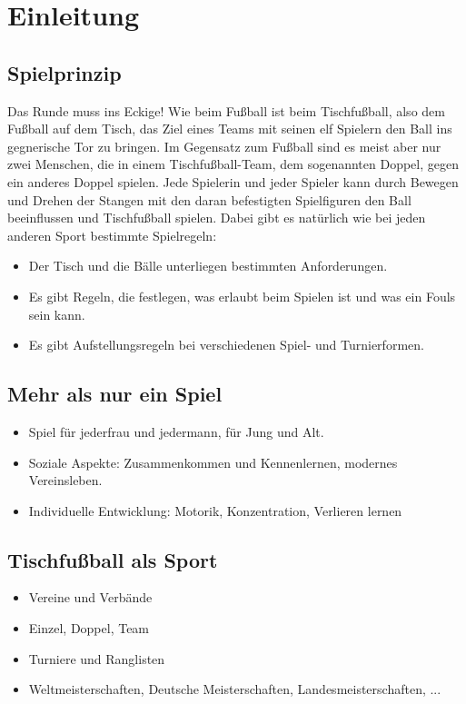 \chapter{Einleitung}

\section{Spielprinzip}

Das Runde muss ins Eckige! Wie beim Fußball ist beim Tischfußball, also dem Fußball auf dem Tisch, das Ziel eines Teams mit seinen elf Spielern den Ball ins gegnerische Tor zu bringen.  
Im Gegensatz zum Fußball sind es meist aber nur zwei Menschen, die in einem Tischfußball-Team, dem sogenannten Doppel, gegen ein anderes Doppel spielen.
Jede Spielerin und jeder Spieler kann durch Bewegen und Drehen der Stangen mit den daran befestigten Spielfiguren den Ball beeinflussen und Tischfußball spielen.
Dabei gibt es natürlich wie bei jeden anderen Sport bestimmte Spielregeln:
\begin{itemize}
\item Der Tisch und die Bälle unterliegen bestimmten Anforderungen.
\item Es gibt Regeln, die festlegen, was erlaubt beim Spielen ist und was ein Fouls sein kann.
\item Es gibt Aufstellungsregeln bei verschiedenen Spiel- und Turnierformen. 
\end{itemize}


\section{Mehr als nur ein Spiel}

\begin{itemize}
\item Spiel für jederfrau und jedermann, für Jung und Alt. 
\item Soziale Aspekte: Zusammenkommen und Kennenlernen, modernes Vereinsleben.
\item Individuelle Entwicklung: Motorik, Konzentration, Verlieren lernen
\end{itemize}

\section{Tischfußball als Sport}

\begin{itemize}
\item Vereine und Verbände
\item Einzel, Doppel, Team
\item Turniere und Ranglisten
\item Weltmeisterschaften, Deutsche Meisterschaften, Landesmeisterschaften, ...
\end{itemize}

